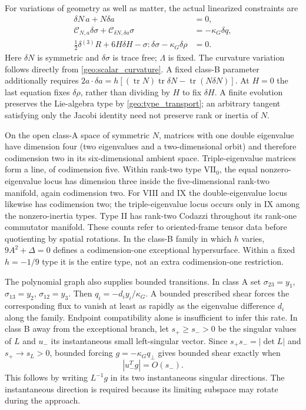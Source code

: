 For variations of geometry as well as matter, the actual linearized constraints are
\begin{align}
 \delta N\,a+N\delta a&=0,\nonumber\\
 \mathcal C_{N,a}\delta\sigma
       +\mathcal C_{\delta N,\delta a}\sigma&=-\kappa_G\delta q,\nonumber\\
 \tfrac12\delta{}^{(3)}R+6H\delta H
             -\sigma:\delta\sigma-\kappa_G\delta\rho&=0.
 \label{geo:constraint_tangent}
\end{align}
Here $\delta N$ is symmetric and $\delta\sigma$ is trace free; $\Lambda$ is fixed. The curvature variation follows directly from \eqref{geo:scalar_curvature}. A fixed class-B parameter additionally requires
$2a\cdot\delta a=h[(\operatorname{tr}N)\operatorname{tr}\delta N-\operatorname{tr}(N\delta N)]$.
At $H=0$ the last equation fixes $\delta\rho$, rather than dividing by $H$ to fix $\delta H$. A finite evolution preserves the Lie-algebra type by \eqref{geo:type_transport}; an arbitrary tangent satisfying only the Jacobi identity need not preserve rank or inertia of $N$.

On the open class-A space of symmetric $N$, matrices with one double eigenvalue have dimension four (two eigenvalues and a two-dimensional orbit) and therefore codimension two in its six-dimensional ambient space. Triple-eigenvalue matrices form a line, of codimension five. Within rank-two type $\mathrm{VII}_0$, the equal nonzero-eigenvalue locus has dimension three inside the five-dimensional rank-two manifold, again codimension two. For VIII and IX the double-eigenvalue locus likewise has codimension two; the triple-eigenvalue locus occurs only in IX among the nonzero-inertia types. Type II has rank-two Codazzi throughout its rank-one commutator manifold. These counts refer to oriented-frame tensor data before quotienting by spatial rotations. In the class-B family in which $h$ varies, $9A^2+\Delta=0$ defines a codimension-one exceptional hypersurface. Within a fixed $h=-1/9$ type it is the entire type, not an extra codimension-one restriction.

The polynomial graph also supplies bounded transitions. In class A set $\sigma_{23}=y_1$, $\sigma_{13}=y_2$, $\sigma_{12}=y_3$. Then
$q_i=-d_i y_i/\kappa_G$. A bounded prescribed shear forces the corresponding flux to vanish at least as rapidly as the eigenvalue difference $d_i$ along the family. Endpoint compatibility alone is insufficient to infer this rate. In class B away from the exceptional branch, let $s_+\ge s_->0$ be the singular values of $L$ and $u_-$ its instantaneous small left-singular vector. Since $s_+s_-=|\det L|$ and $s_+\to s_L>0$, bounded forcing $g=-\kappa_Gq_\perp$ gives bounded shear exactly when
\begin{equation}
 |u_-^Tg|=O(s_-).
 \label{geo:rank_transition}
\end{equation}
This follows by writing $L^{-1}g$ in its two instantaneous singular directions. The instantaneous direction is required because its limiting subspace may rotate during the approach.

